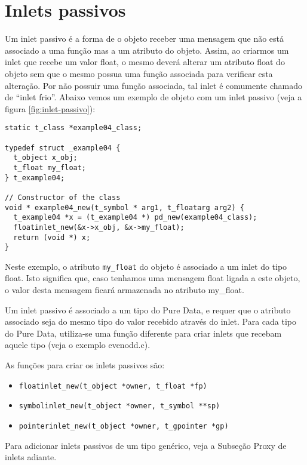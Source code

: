 \section{Inlets passivos}

Um inlet passivo é a forma de o objeto receber uma mensagem que não está
associado a uma função mas a um atributo do objeto.
Assim, ao criarmos um inlet que recebe um valor float, o mesmo deverá alterar um
atributo float do objeto sem que o mesmo possua uma função associada para
verificar esta alteração.
Por não possuir uma função associada, tal inlet é comumente chamado de ``inlet
frio''.
Abaixo vemos um exemplo de objeto com um inlet passivo (veja a figura
\ref{fig:inlet-passivo}):

\begin{lstlisting}[caption=Exemplo de inlet passivo]
static t_class *example04_class;

typedef struct _example04 {
  t_object x_obj;
  t_float my_float;
} t_example04;

// Constructor of the class
void * example04_new(t_symbol * arg1, t_floatarg arg2) {
  t_example04 *x = (t_example04 *) pd_new(example04_class);
  floatinlet_new(&x->x_obj, &x->my_float);
  return (void *) x;
}
\end{lstlisting}

Neste exemplo, o atributo \texttt{my\_float} do objeto é associado a um inlet do
tipo float.
Isto  significa que, caso tenhamos uma mensagem float ligada a este objeto, o valor
desta mensagem ficará armazenada no atributo my\_float.

Um inlet passivo é associado a um tipo do Pure Data, e requer que o atributo
associado seja do mesmo tipo do valor recebido através do inlet.
Para cada tipo do Pure Data, utiliza-se uma função diferente para criar inlets
que recebam aquele tipo (veja o exemplo evenodd.c).

As funções para criar os inlets passivos são:

\begin{itemize}
\item \texttt{floatinlet\_new(t\_object *owner, t\_float *fp)}
\item \texttt{symbolinlet\_new(t\_object *owner, t\_symbol **sp)}
\item \texttt{pointerinlet\_new(t\_object *owner, t\_gpointer *gp)}
\end{itemize}

Para adicionar inlets passivos de um tipo genérico, veja a Subseção Proxy de inlets
adiante.

